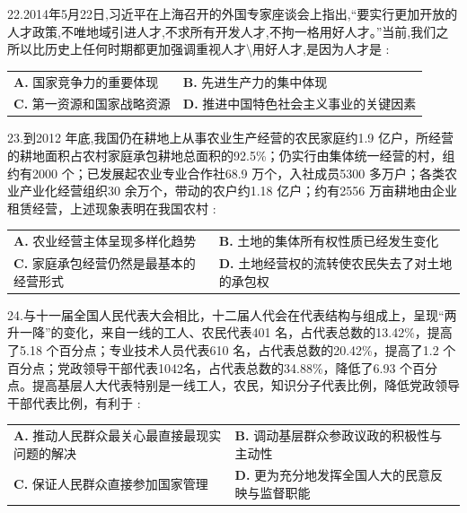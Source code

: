 \documentclass[UTF8,11pt]{ctexart}
\begin{document}
22.2014年5月22日,习近平在上海召开的外国专家座谈会上指出,“要实行更加开放的人才政策,不唯地域引进人才,不求所有开发人才,不拘一格用好人才。”当前,我们之所以比历史上任何时期都更加强调重视人才\textbackslash{}用好人才,是因为人才是 :


\begin{center}\begin{tabular}{>{\raggedright\arraybackslash}p{\dimexpr(\linewidth-4\tabcolsep)/2\relax}>{\raggedright\arraybackslash}p{\dimexpr(\linewidth-4\tabcolsep)/2\relax}}
\textbf{A.} 国家竞争力的重要体现 & \textbf{B.} 先进生产力的集中体现\\[.35em]
\textbf{C.} 第一资源和国家战略资源 & \textbf{D.} 推进中国特色社会主义事业的关键因素\\[.35em]\end{tabular}\end{center}

23.到2012 年底,我国仍在耕地上从事农业生产经营的农民家庭约1.9 亿户，所经营的耕地面积占农村家庭承包耕地总面积的92.5\%；仍实行由集体统一经营的村，组约有2000 个；已发展起农业专业合作社68.9 万个，入社成员5300 多万户；各类农业产业化经营组织30 余万个，带动的农户约1.18 亿户；约有2556 万亩耕地由企业租赁经营，上述现象表明在我国农村 :


\begin{center}\begin{tabular}{>{\raggedright\arraybackslash}p{\dimexpr(\linewidth-4\tabcolsep)/2\relax}>{\raggedright\arraybackslash}p{\dimexpr(\linewidth-4\tabcolsep)/2\relax}}
\textbf{A.} 农业经营主体呈现多样化趋势 & \textbf{B.} 土地的集体所有权性质已经发生变化\\[.35em]
\textbf{C.} 家庭承包经营仍然是最基本的经营形式 & \textbf{D.} 土地经营权的流转使农民失去了对土地的承包权\\[.35em]\end{tabular}\end{center}

24.与十一届全国人民代表大会相比，十二届人代会在代表结构与组成上，呈现“两升一降”的变化，来自一线的工人、农民代表401 名，占代表总数的13.42\%，提高了5.18 个百分点；专业技术人员代表610 名，占代表总数的20.42\%，提高了1.2 个百分点；党政领导干部代表1042名，占代表总数的34.88\%，降低了6.93 个百分点。提高基层人大代表特别是一线工人，农民，知识分子代表比例，降低党政领导干部代表比例，有利于 :


\begin{center}\begin{tabular}{>{\raggedright\arraybackslash}p{\dimexpr(\linewidth-4\tabcolsep)/2\relax}>{\raggedright\arraybackslash}p{\dimexpr(\linewidth-4\tabcolsep)/2\relax}}
\textbf{A.} 推动人民群众最关心最直接最现实问题的解决 & \textbf{B.} 调动基层群众参政议政的积极性与主动性\\[.35em]
\textbf{C.} 保证人民群众直接参加国家管理 & \textbf{D.} 更为充分地发挥全国人大的民意反映与监督职能\\[.35em]\end{tabular}\end{center}
\end{document}
